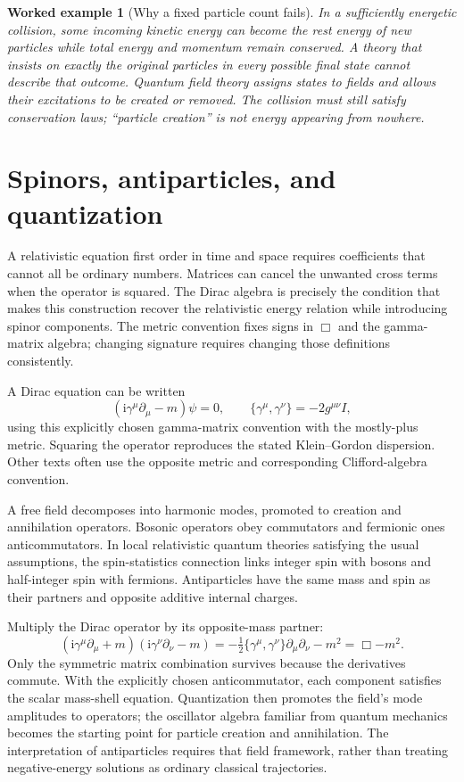 \documentclass[11pt,oneside]{book}
\newcommand{\ii}{\mathrm{i}}
\theoremstyle{reviewstyle}
\newtheorem{example}{Worked example}[chapter]
\begin{document}
\begin{example}[Why a fixed particle count fails]
In a sufficiently energetic collision, some incoming kinetic energy can become the rest energy of new particles while total energy and momentum remain conserved. A theory that insists on exactly the original particles in every possible final state cannot describe that outcome. Quantum field theory assigns states to fields and allows their excitations to be created or removed. The collision must still satisfy conservation laws; ``particle creation'' is not energy appearing from nowhere.
\end{example}

\section{Spinors, antiparticles, and quantization}
A relativistic equation first order in time and space requires coefficients that cannot all be ordinary numbers. Matrices can cancel the unwanted cross terms when the operator is squared. The Dirac algebra is precisely the condition that makes this construction recover the relativistic energy relation while introducing spinor components. The metric convention fixes signs in $\Box$ and the gamma-matrix algebra; changing signature requires changing those definitions consistently.

A Dirac equation can be written
\begin{equation}(\ii\gamma^\mu\partial_\mu-m)\psi=0,\qquad \{\gamma^\mu,\gamma^\nu\}=-2g^{\mu\nu}I,\end{equation}
using this explicitly chosen gamma-matrix convention with the mostly-plus metric. Squaring the operator reproduces the stated Klein--Gordon dispersion. Other texts often use the opposite metric and corresponding Clifford-algebra convention.

A free field decomposes into harmonic modes, promoted to creation and annihilation operators. Bosonic operators obey commutators and fermionic ones anticommutators. In local relativistic quantum theories satisfying the usual assumptions, the spin-statistics connection links integer spin with bosons and half-integer spin with fermions. Antiparticles have the same mass and spin as their partners and opposite additive internal charges.

Multiply the Dirac operator by its opposite-mass partner:
\begin{equation}
(\ii\gamma^\mu\partial_\mu+m)(\ii\gamma^\nu\partial_\nu-m)
=-\tfrac12\{\gamma^\mu,\gamma^\nu\}\partial_\mu\partial_\nu-m^2
=\Box-m^2.
\end{equation}
Only the symmetric matrix combination survives because the derivatives commute. With the explicitly chosen anticommutator, each component satisfies the scalar mass-shell equation. Quantization then promotes the field's mode amplitudes to operators; the oscillator algebra familiar from quantum mechanics becomes the starting point for particle creation and annihilation. The interpretation of antiparticles requires that field framework, rather than treating negative-energy solutions as ordinary classical trajectories.
\end{document}
